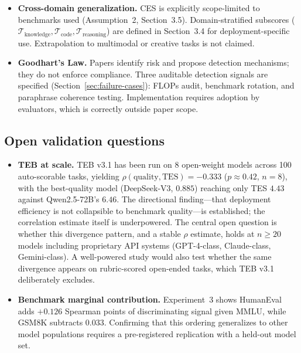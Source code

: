 \documentclass[12pt]{article}
\begin{document}
\begin{itemize}
\item \textbf{Cross-domain generalization.} CES is explicitly scope-limited to benchmarks used (Assumption~2, Section~3.5). Domain-stratified subscores ($\mathcal{T}_{\text{knowledge}}, \mathcal{T}_{\text{code}}, \mathcal{T}_{\text{reasoning}}$) are defined in Section~3.4 for deployment-specific use. Extrapolation to multimodal or creative tasks is not claimed.

\item \textbf{Goodhart's Law.} Papers identify risk and propose detection mechanisms; they do not enforce compliance. Three auditable detection signals are specified (Section~\ref{sec:failure-cases}): FLOPs audit, benchmark rotation, and paraphrase coherence testing. Implementation requires adoption by evaluators, which is correctly outside paper scope.

\end{itemize}

\subsection*{Open validation questions}

\begin{itemize}

\item \textbf{TEB at scale.} TEB v3.1 has been run on 8 open-weight models across 100 auto-scorable tasks, yielding $\rho(\mathrm{quality}, \mathrm{TES}) = -0.333$ ($p \approx 0.42$, $n=8$), with the best-quality model (DeepSeek-V3, $0.885$) reaching only TES $4.43$ against Qwen2.5-72B's $6.46$. The directional finding---that deployment efficiency is not collapsible to benchmark quality---is established; the correlation estimate itself is underpowered. The central open question is whether this divergence pattern, and a stable $\rho$ estimate, holds at $n \geq 20$ models including proprietary API systems (GPT-4-class, Claude-class, Gemini-class). A well-powered study would also test whether the same divergence appears on rubric-scored open-ended tasks, which TEB v3.1 deliberately excludes.

\item \textbf{Benchmark marginal contribution.} Experiment~3 shows HumanEval adds $+0.126$ Spearman points of discriminating signal given MMLU, while GSM8K subtracts $0.033$. Confirming that this ordering generalizes to other model populations requires a pre-registered replication with a held-out model set.

\end{itemize}
\end{document}
